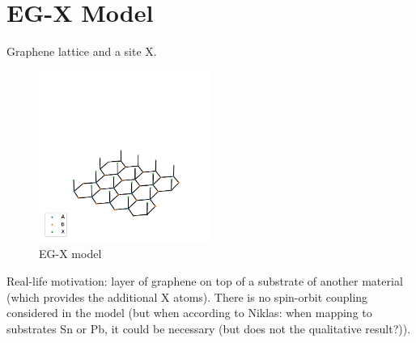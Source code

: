 \documentclass[../main.tex]{subfiles}
\begin{document}
\section{EG-X Model}\label{sec:eg-x-model}

Graphene lattice and a site X\@.
\begin{figure}[htb]
    \centering
    \includegraphics[width=0.5\textwidth]{images/eg-x lattice}
    \caption{EG-X model}
    \label{fig:eg-x model}
\end{figure}
Real-life motivation: layer of graphene on top of a substrate of another material (which provides the additional X atoms).
There is no spin-orbit coupling considered in the model (but when according to Niklas: when mapping to substrates Sn or Pb, it could be necessary (but does not the qualitative result?)).
\end{document}

